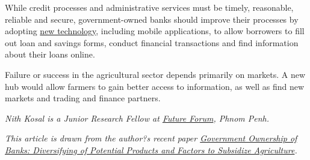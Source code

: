 \documentclass[10pt,a4paper]{letter}
\begin{document}
While credit processes and administrative services must be timely, reasonable, reliable and secure, government-owned banks should improve their processes by adopting \href{https://www.wowso.me/blog/technology-in-banking}{new technology}, including mobile applications, to allow borrowers to fill out loan and savings forms, conduct financial transactions and find information about their loans online.

Failure or success in the agricultural sector depends primarily on markets. A new hub would allow farmers to gain better access to information, as well as find new markets and trading and finance partners.

\textit{Nith Kosal is a Junior Research Fellow at \href{https://www.futureforum.asia/}{Future Forum}, Phnom Penh.}

\textit{This article is drawn from the author?s recent paper \href{https://nithkosal.github.io/research/papers/WP0002.pdf}{Government Ownership of Banks: Diversifying of Potential Products and Factors to Subsidize Agriculture}.}
\end{document}
